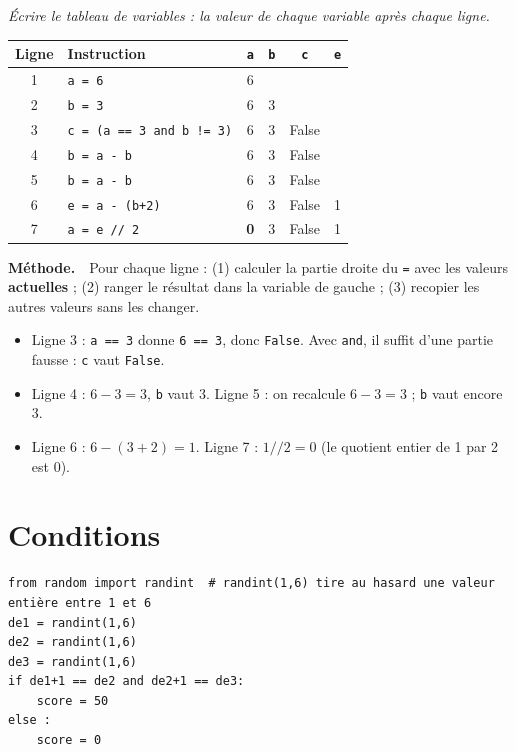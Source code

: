 \documentclass[addpoints, 11pt]{exam}
\newcommand{\enonce}[1]{\textit{#1}\par\smallskip}
\newcommand{\methode}{\par\smallskip\noindent\textbf{Méthode.}\ }
\newcommand{\code}[1]{\texttt{#1}}
\DeclareRobustCommand{\_}{\textunderscore\allowbreak}
\begin{document}
\begin{questions}
\question[2] \enonce{Écrire le tableau de variables : la valeur de chaque variable après chaque ligne.}
\begin{reponse}
\begin{center}
\begin{tabular}{|c|l|c|c|c|c|}
\hline
Ligne & Instruction & \code{a} & \code{b} & \code{c} & \code{e} \\ \hline
1 & \code{a = 6} & 6 & & & \\
2 & \code{b = 3} & 6 & 3 & & \\
3 & \code{c = (a == 3 and b != 3)} & 6 & 3 & False & \\
4 & \code{b = a - b} & 6 & 3 & False & \\
5 & \code{b = a - b} & 6 & 3 & False & \\
6 & \code{e = a - (b+2)} & 6 & 3 & False & 1 \\
7 & \code{a = e // 2} & \textbf{0} & 3 & False & 1 \\ \hline
\end{tabular}
\end{center}
\end{reponse}
\methode\ Pour chaque ligne : (1) calculer la partie droite du \code{=} avec les valeurs \textbf{actuelles} ; (2) ranger le résultat dans la variable de gauche ; (3) recopier les autres valeurs sans les changer.
\begin{itemize}
  \item Ligne 3 : \code{a == 3} donne \code{6 == 3}, donc \code{False}. Avec \code{and}, il suffit d'une partie fausse : \code{c} vaut \code{False}.
  \item Ligne 4 : $6 - 3 = 3$, \code{b} vaut 3. Ligne 5 : on recalcule $6 - 3 = 3$ ; \code{b} vaut encore 3.
  \item Ligne 6 : $6 - (3 + 2) = 1$. Ligne 7 : $1 // 2 = 0$ (le quotient entier de 1 par 2 est 0).
\end{itemize}

\section{Conditions}

\begin{lstlisting}
from random import randint  # randint(1,6) tire au hasard une valeur entière entre 1 et 6
de1 = randint(1,6)
de2 = randint(1,6)
de3 = randint(1,6)
if de1+1 == de2 and de2+1 == de3:
    score = 50
else :
    score = 0


\end{lstlisting}
\end{questions}
\end{document}
